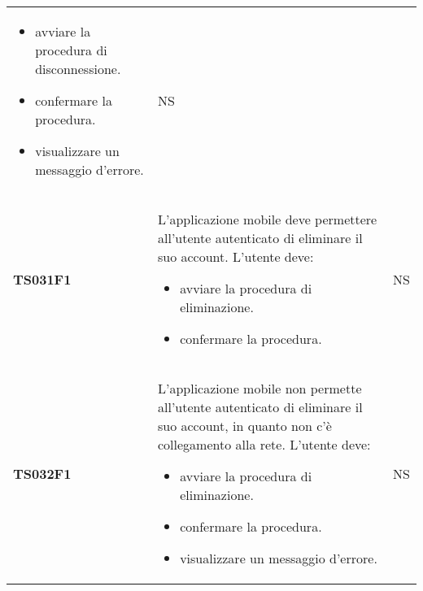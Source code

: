 \documentclass[../piano-di-qualifica.tex]{subfiles}
\begin{document}
\begin{longtable}[H]{>{\centering\bfseries}m{3cm} >{}m{10cm} >{\centering\arraybackslash}m{3cm}}
\begin{itemize}
    \item avviare la procedura di disconnessione.
    \item confermare la procedura.
    \item visualizzare un messaggio d'errore.
  \end{itemize}
                     & NS                                                                                                                                                                                                                                                               \\
  TS031F1            & L'applicazione mobile deve permettere all'utente autenticato di eliminare il suo account. \newline
  L'utente deve:
  \begin{itemize}
    \item avviare la procedura di eliminazione.
    \item confermare la procedura.
  \end{itemize}
                     & NS                                                                                                                                                                                                                                                               \\
  TS032F1            & L'applicazione mobile non permette all'utente autenticato di eliminare il suo account, in quanto non c'è collegamento alla rete. \newline
  L'utente deve:
  \begin{itemize}
    \item avviare la procedura di eliminazione.
    \item confermare la procedura.
    \item visualizzare un messaggio d'errore.
  \end{itemize}
                     & NS                                                                                                                                                                                                                                                               \\



\end{longtable}
\end{document}
